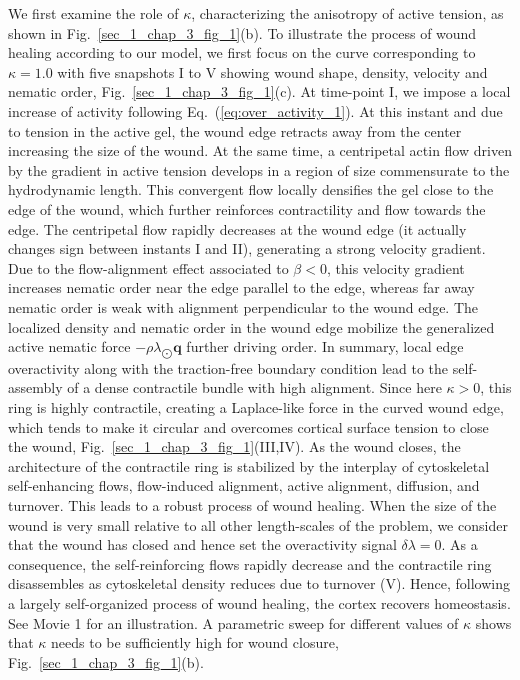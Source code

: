 \documentclass[12pt]{iopart}
\begin{document}
	We first examine the role of $\kappa$, characterizing the anisotropy of active tension, as shown in Fig.~\ref{sec_1_chap_3_fig_1}(b). To illustrate the process of wound healing according to our model, we first focus on the curve corresponding to $\kappa=1.0$ with five snapshots I to V showing wound shape, density, velocity and nematic order, Fig.~\ref{sec_1_chap_3_fig_1}(c).  At time-point I, we impose a local increase of activity following Eq.~(\ref{eq:over_activity_1}). At this instant and due to tension in the active gel, the wound edge retracts away from the center increasing the size of the wound. At the same time, a centripetal actin flow driven by the gradient in active tension develops in a region of size commensurate to the hydrodynamic length. This convergent flow locally densifies the gel close to the edge of the wound, which further reinforces contractility and  flow towards the edge. The centripetal flow rapidly decreases at the wound edge (it actually changes sign between instants I and II), generating a strong velocity gradient. Due to the flow-alignment effect associated to $\beta<0$, this velocity gradient increases nematic order near the edge parallel to the edge, whereas far away nematic order is weak with alignment perpendicular to the wound edge. The localized density and nematic order in the wound edge mobilize the generalized active nematic force $-\rho\lambda_{\bigodot}\bm{q}$ further driving order. In summary, local edge overactivity along with the traction-free boundary condition lead to the self-assembly of a dense contractile bundle with high alignment. Since here $\kappa >0$, this ring is highly contractile, creating a Laplace-like force in the curved wound edge, which tends to make it circular and overcomes cortical surface tension to close the wound, Fig.~\ref{sec_1_chap_3_fig_1}(III,IV). As the wound closes, the architecture of the contractile ring is stabilized by the interplay of cytoskeletal self-enhancing flows, flow-induced alignment, active alignment, diffusion, and  turnover. This leads to a robust process of wound healing. When the size of the wound is very small relative to all other length-scales of the problem, we consider that the wound has closed and hence set the overactivity signal $\delta \lambda=0$. As a consequence,  the self-reinforcing flows rapidly decrease and  the contractile ring disassembles as cytoskeletal density reduces due to turnover (V). Hence, following a largely self-organized process of wound healing, the cortex recovers homeostasis. See Movie 1 for an illustration. A parametric sweep for different values of $\kappa$ shows that $\kappa$ needs to be sufficiently high for wound closure, Fig.~\ref{sec_1_chap_3_fig_1}(b).
	
\end{document}
